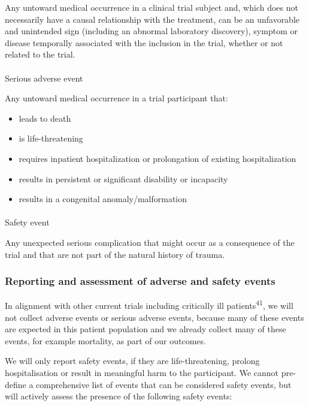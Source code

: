 \documentclass[
]{scrartcl}
\makeatletter
\let\oldparagraph\paragraph
\renewcommand{\paragraph}{
    \@ifstar
      \xxxParagraphStar
      \xxxParagraphNoStar
  }
\newcommand{\xxxParagraphStar}[1]{\oldparagraph*{#1}\mbox{}}
\newcommand{\xxxParagraphNoStar}[1]{\oldparagraph{#1}\mbox{}}
\providecommand{\tightlist}{%
  \setlength{\itemsep}{0pt}\setlength{\parskip}{0pt}}\usepackage{longtable,booktabs,array}
\makeatother
\begin{document}
Any untoward medical occurrence in a clinical trial subject and, which
does not necessarily have a causal relationship with the treatment, can
be an unfavorable and unintended sign (including an abnormal laboratory
discovery), symptom or disease temporally associated with the inclusion
in the trial, whether or not related to the trial.

\paragraph{Serious adverse event}\label{serious-adverse-event}

Any untoward medical occurrence in a trial participant that:

\begin{itemize}
\tightlist
\item
  leads to death
\item
  is life-threatening
\item
  requires inpatient hospitalization or prolongation of existing
  hospitalization
\item
  results in persistent or significant disability or incapacity
\item
  results in a congenital anomaly/malformation
\end{itemize}

\paragraph{Safety event}\label{safety-event}

Any unexpected serious complication that might occur as a consequence of
the trial and that are not part of the natural history of trauma.

\subsubsection{Reporting and assessment of adverse and safety
events}\label{reporting-and-assessment-of-adverse-and-safety-events}

In alignment with other current trials including critically ill
patients\textsuperscript{41}, we will not collect adverse events or
serious adverse events, because many of these events are expected in
this patient population and we already collect many of these events, for
example mortality, as part of our outcomes.

We will only report safety events, if they are life-threatening, prolong
hospitalisation or result in meaningful harm to the participant. We
cannot pre-define a comprehensive list of events that can be considered
safety events, but will actively assess the presence of the following
safety events:
\end{document}

